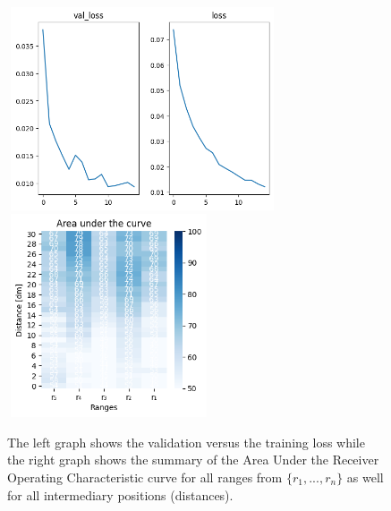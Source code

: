 \begin{multicols}{2}
\end{multicols}\begin{figure}[H]%
\centering
\includegraphics[width=8cm,height=6cm]{3_models/models_25/graph_25.png}
\hspace{0.2 cm}
\includegraphics[width=6cm,height=6cm]{4_plots/plots_25/AUC_25.png}
\caption{The left graph shows the validation versus the training loss while the right graph shows the summary of the Area Under the Receiver Operating Characteristic curve for all ranges from $\{r_{1}, ... ,r_{n}\}$ as well for all intermediary positions (distances).}
\label{auc_25}
\end{figure}
\newpage


\newpage
